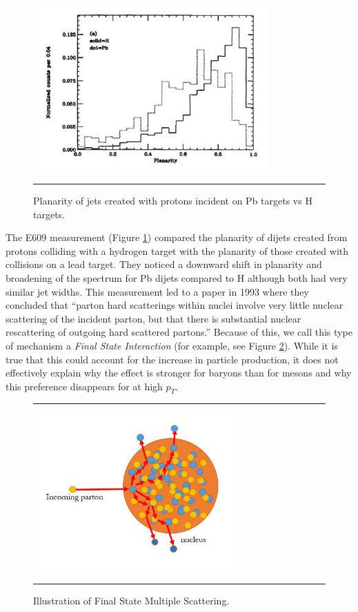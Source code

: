 \begin{figure}[htbp!]
  \centering
    \includegraphics[width=0.8\textwidth]{prevplots/e609planarity.jpg}
    \rule{35em}{0.5pt}
  \caption[Planarity of jets created with protons incident on Pb targets vs H targets.]{Planarity of jets created with protons incident on Pb targets vs H targets.}
  \label{fig:e609planarity}
\end{figure}
The E609 measurement (Figure \ref{fig:e609planarity}) compared the planarity of dijets created from protons colliding with a hydrogen target with the planarity of those created with collisions on a lead target. They noticed a downward shift in planarity and broadening of the spectrum for Pb dijets compared to H although both had very similar jet widths. This measurement led to a paper in 1993 where they concluded that ``parton hard scatterings within nuclei involve very little nuclear scattering of the incident parton, but that there is substantial nuclear rescattering of outgoing hard scattered partons.'' \citep{PhysRevLett.70.143} Because of this, we call this type of mechanism a \textit{Final State Interaction} (for example, see Figure \ref{fig:FSIscattering}). While it is true that this could account for the increase in particle production, it does not effectively explain why the effect is stronger for baryons than for mesons and why this preference disappears for at high $p_{T}$.
\begin{figure}[htbp!]
  \centering
    \rule{35em}{0.5pt}
    \includegraphics[width=0.7\textwidth]{Figures/FSIscattering.jpg}

  \caption[Illustration of Final State Multiple Scattering]{Illustration of Final State Multiple Scattering.}
  \label{fig:FSIscattering}
    \rule{35em}{0.5pt}
\end{figure} 

